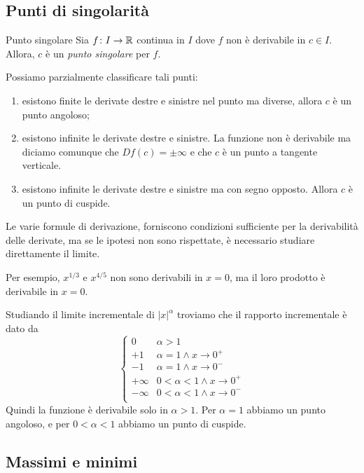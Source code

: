 \documentclass[a4paper]{article}
\begin{document}
\subsection{Punti di singolarità}

\begin{snippetdefinition}{Punto singolare}
    Sia \(f \colon I \to \mathbb{R}\) continua in \(I\) dove \(f\)
    non è derivabile in \(c\in I\).
    Allora, \(c\) è un \emph{punto singolare} per \(f\).
\end{snippetdefinition}

Possiamo parzialmente classificare tali punti:
\begin{enumerate}
    \item esistono finite le derivate destre e sinistre nel punto ma diverse, allora
        \(c\) è un punto angoloso;
    \item esistono infinite le derivate destre e sinistre. La funzione non è derivabile ma diciamo
    comunque che \(Df(c) = \pm \infty\) e che \(c\) è un punto a tangente verticale.
    \item esistono infinite le derivate destre e sinistre ma con segno opposto.
        Allora \(c\) è un punto di cuspide.
\end{enumerate}

Le varie formule di derivazione, forniscono condizioni sufficiente
per la derivabilità delle derivate, ma se le ipotesi non sono rispettate,
è necessario studiare direttamente il limite.

Per esempio, \(x^{1/3}\) e \(x^{4/5}\) non sono derivabili in \(x=0\),
ma il loro prodotto è derivabile in \(x=0\).

Studiando il limite incrementale di \({|x|}^\alpha\) troviamo che
il rapporto incrementale è dato da
\[
    \begin{cases}
        0 & \alpha > 1 \\
        +1 & \alpha = 1 \land x \to 0^+ \\
        -1 & \alpha = 1 \land x \to 0^- \\
        +\infty & 0<\alpha<1 \land x \to 0^+ \\
        -\infty & 0<\alpha<1 \land x \to 0^- \\
    \end{cases}
\]
Quindi la funzione è derivabile solo in \(\alpha > 1\).
Per \(\alpha=1\) abbiamo un punto angoloso, e per \(0<\alpha<1\)
abbiamo un punto di cuspide.

\pagebreak

\subsection{Massimi e minimi}
\end{document}
